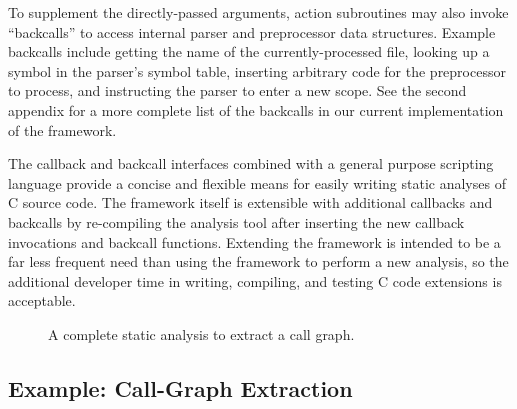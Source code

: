 \documentclass{article}
\newcommand{\C}{\mbox{C}}
\begin{document}
To supplement the directly-passed arguments, action subroutines may also invoke
``backcalls'' to access internal
parser and preprocessor data structures. Example backcalls include
getting the name of the currently-processed file, looking up a symbol in
the parser's symbol table, inserting arbitrary code for the preprocessor
to process, and instructing the parser to enter a new scope. 
See the second appendix
for a more complete list of
the backcalls in our current implementation of the framework.

The callback and backcall interfaces combined with a general
purpose scripting language provide a concise and flexible means for
easily writing static analyses of \C{} source code.  The framework
itself is extensible with additional callbacks and backcalls by
re-compiling the analysis tool after inserting the new callback
invocations and backcall functions.  Extending the framework is intended 
to be a far less frequent need than using the framework to perform a new 
analysis, so the additional developer time in writing, compiling, and
testing C code extensions is acceptable.


\begin{figure}[p]
\begin{center}
\begin{small}
\end{small}
\caption{A complete static analysis to extract a call graph.}
\label{fig:call_graph_extractor}
\end{center}
\end{figure}

\subsection*{Example: Call-Graph Extraction}
\label{sec:call_graph_extraction}
\end{document}
